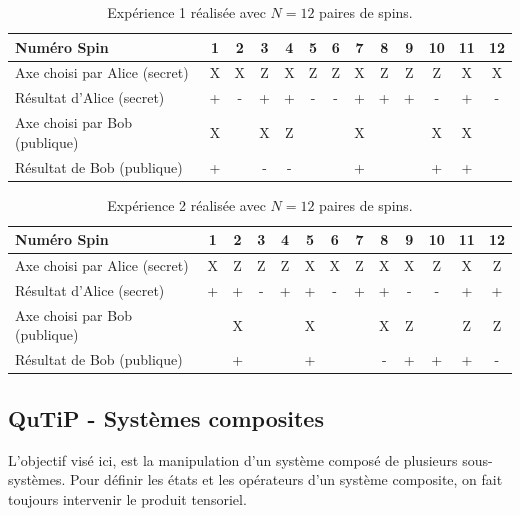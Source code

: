 \begin{table}[htp]
\centering
\begin{tabular}{|l|c|c|c|c|c|c|c|c|c|c|c|c|}\hline
Numéro Spin & 1 &\cellcolor[gray]{.8} 2 & 3 & 4 &\cellcolor[gray]{.8} 5
&\cellcolor[gray]{.8} 6 & 7 &\cellcolor[gray]{.8} 8 &\cellcolor[gray]{.8} 9 & 10
& 11 &\cellcolor[gray]{.8} 12\\\hline
Axe  choisi par Alice (secret) & X &\cellcolor[gray]{.8} X & Z & X
&\cellcolor[gray]{.8} Z &\cellcolor[gray]{.8} Z & X &\cellcolor[gray]{.8} Z
&\cellcolor[gray]{.8} Z & Z & X &\cellcolor[gray]{.8}
X\\\hline
Résultat d'Alice (secret) & + &\cellcolor[gray]{.8} - & + & +
&\cellcolor[gray]{.8} - &\cellcolor[gray]{.8} - & + &\cellcolor[gray]{.8} +
&\cellcolor[gray]{.8} + & - & + &\cellcolor[gray]{.8}
-\\\hline
Axe choisi par Bob (publique) & X &  & X & Z &  &  & X &  &  & X & X &
\\\hline
Résultat de Bob (publique) & + &  & - & - &  &  & + &  &  & + & + & \\\hline
\end{tabular}
\caption{\small Expérience 1 réalisée avec $N=12$ paires de spins.}
\label{tab:Exp1}
\end{table}

\begin{table}[htp]
\centering
\begin{tabular}{|l|c|c|c|c|c|c|c|c|c|c|c|c|}\hline
Numéro Spin & 1 & 2 & 3 & 4 & 5 & 6 & 7 & 8 & 9 & 10 & 11 &  12\\\hline
Axe  choisi par Alice (secret) & X & Z & Z & Z & X & X & Z & X & X & Z & X &
Z\\\hline
Résultat d'Alice (secret) & + & + & - & + & + & - & + & + & - & - & + &
+\\\hline
Axe choisi par Bob (publique) &  & X &  &  & X &  &  & X & Z &  & Z & Z\\\hline
Résultat de Bob (publique) &  &  +&  &  & + &  & & - & + & +& + & -\\\hline
\end{tabular}
\caption{\small Expérience 2 réalisée avec $N=12$ paires de spins.}
\label{tab:Exp2}
\end{table}

\subsection{QuTiP - Systèmes composites}
L'objectif visé ici, est la manipulation d'un système composé de plusieurs sous-systèmes. Pour définir les états et les opérateurs d'un système composite, on fait toujours intervenir le produit tensoriel.


